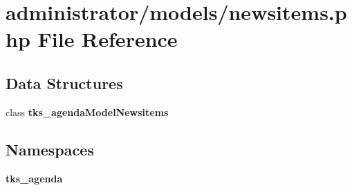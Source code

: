 \section{administrator/models/newsitems.php File Reference}
\label{administrator_2models_2newsitems_8php}
\subsection*{Data Structures}
\begin{DoxyCompactItemize}
\item 
class \textbf{ tks\+\_\+agenda\+Model\+Newsitems}
\end{DoxyCompactItemize}
\subsection*{Namespaces}
\begin{DoxyCompactItemize}
\item 
 \textbf{ tks\+\_\+agenda}
\end{DoxyCompactItemize}
